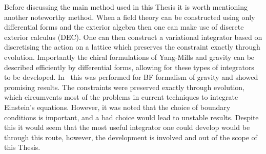 \documentclass[10pt]{report}
\theoremstyle{definition}
\begin{document}
Before discussing the main method used in this Thesis it is worth mentioning another noteworthy method. When a field theory can be constructed using only differential forms and the exterior algebra then one can make use of discrete exterior calculus (DEC). One can then construct a variational integrator based on discretising the action on a lattice which preserves the constraint exactly through evolution. Importantly the chiral formulations of Yang-Mills and gravity can be described efficiently by differential forms, allowing for these types of integrators to be developed. In~\cite{NumericalRelatFarr2010} this was performed for BF formalism of gravity and showed promising results. The constraints were preserved exactly through evolution, which circumvents most of the problems in current techniques to integrate Einstein's equations. However, it was noted that the choice of boundary conditions is important, and a bad choice would lead to unstable results. Despite this it would seem that the most useful integrator one could develop would be through this route, however, the development is involved and out of the scope of this Thesis.
\end{document}
